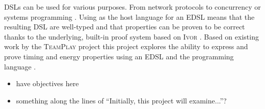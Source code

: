 DSLs can be used for various purposes. From network protocols \cite{5158855} to concurrency or systems programming \cite{brady2010correct,10.1007/978-3-642-27694-1_18}. Using \Idris as the host language for an EDSL means that the resulting DSL are well-typed and that properties can be proven to be correct thanks to the underlying, built-in proof system based on \textsc{Ivor} \cite{10.1007/978-3-540-74130-5_9,brady_2013}. Based on existing work by the \textsc{TeamPlay} project \cite{teamplay:d1.1} this project explores the ability to express and prove timing and energy properties using an EDSL and the \Idris programming language \cite{brady_2013}.

\begin{itemize}
	\item have objectives here
	\item something along the lines of ``Initially, this project will examine...''?
\end{itemize}